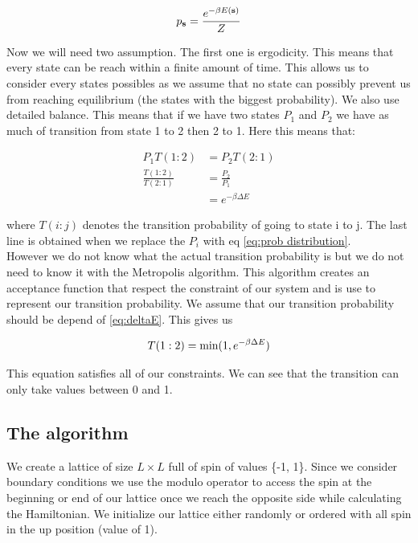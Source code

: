 \documentclass[english,notitlepage,reprint,nofootinbib]{revtex4-2}  %
\begin{document}
	\begin{equation}
		p_{\rm \textbf{s}} = \frac{e^{-\beta E(\textbf{s})}}{Z} \label{eq:prob distribution}
	\end{equation}	 
	
	
	Now we will need two assumption. The first one is ergodicity. This means that every state
	can be reach within a finite amount of time. This allows us to consider every states possibles
	as we assume that no state can possibly prevent us from reaching equilibrium (the states 
	with the biggest probability). We also use detailed balance. This means that if we have
	two states $P_1$ and $P_2$ we have as much of transition from state 1 to 2 then 2 to 1. Here
	this means that:
	
	\begin{align}
		P_1 T(1:2) &= P_2T(2:1) \\
		\frac{T(1:2)}{T(2:1)} &= \frac{P_2}{P_1} \\ 
		&= e^{-\beta \Delta E} \label{eq:deltaE}
	\end{align}

	where $T(i:j)$ denotes the transition probability of going to state i to j. The last line 
	is obtained when we replace the $P_i$ with eq \ref{eq:prob distribution}. \\
	
	However we do not know what the actual transition probability is but we do not need to know
	it with the Metropolis algorithm. This algorithm creates an acceptance function that respect
	the constraint of our system and is use to represent our transition probability. We assume 
	that our transition probability should be depend of \ref{eq:deltaE}. This gives us
	
	\begin{equation}
		T(1:2) = \text{min}(1, e^{-\beta \Delta E\\}) \label{eq:metropolis}
	\end{equation}
	
	
	This equation satisfies all of our constraints. We can see that the transition can only
	take values between 0 and 1. 
	
	\subsection*{The algorithm}\label{subsec:you suck eloi}
	
	We create a lattice of size $L \times L $ full of spin of values \{-1, 1\}. Since we 
	consider boundary conditions we use the modulo operator to access the spin at the beginning
	or end of our lattice once we reach the opposite side while calculating the Hamiltonian. We
	initialize our lattice either randomly or ordered with all spin in the up position (value
	of 1). \\
	
\end{document}
